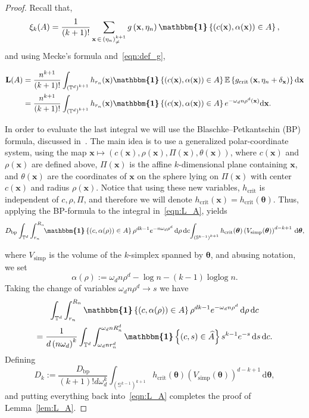 \documentclass[10pt]{amsart}
\theoremstyle{definition}\newtheorem{defi}[theo]{Definition}\newtheorem{rema}[theo]{Remark}\newtheorem{exam}[theo]{Example}\newtheorem{exem}[theo]{Example}\newtheorem{nota}[theo]{Notation}
\DeclareMathOperator{\logg}{\log\log}
\DeclareMathOperator{\simp}{simp}
\newcommand*\bL{\mathbf{L}}
\newcommand{\bx}{\mathbf{x}}
\newcommand*\T{\mathbb{T}}
\newcommand{\E}{\mathbb{E}}
\renewcommand*\S{\mathbb{S}}
\newcommand*\md{\mathrm{d}}
\newcommand{\mean}[1] {\E\left\{{#1}\right\}}
\newcommand{\ind}{\boldsymbol{\mathbbm{1}}}
\newcommand{\set}[1]{\left\{#1\right\}}
\newcommand*\bth{\boldsymbol\theta}
\newcommand*\gcrit{g_{\mathrm{crit}}}
\newcommand*\hcrit{h_{\mathrm{crit}}}
\newcommand*\Abp{{D}_{\mathrm{bp}}}
\newcommand*\vsimp{V_{\simp}}
\let\oldhat\hat
\renewcommand*{\hat}[1]{\mathchoice{\widehat{#1}}{\widehat{#1}}{\oldhat{#1}}{\oldhat{#1}}}
\begin{document}
\begin{proof}
Recall that,
\[
\xi_k(A) = \frac{1}{(k+1)!} \sum_{\bx\,\in\,\left(\eta_n\right)^{k+1}_{\ne}} g\left(\bx,\eta_n\right) \ind\set{\left(c(\bx),\alpha(\bx)\right)\in A},
\]
and using Mecke's formula and~\eqref{eqn:def_g},

\begin{equation}\label{eqn:L_A}
\begin{split}
\bL(A) &= \frac{n^{k+1}}{(k+1)!} \int_{\left(\T^d\right)^{k+1}}h_{r_n}(\bx)\ind\set{\left(c(\bx),\alpha(\bx)\right)\in A}\mean{\gcrit\left(\bx,\eta_n+\delta_{\bx}\right)} \md \bx\\
&= \frac{n^{k+1}}{(k+1)!} \int_{\left(\T^d\right)^{k+1}}h_{r_n}(\bx)\ind\set{\left(c(\bx),\alpha(\bx)\right)\in A}e^{-\omega_dn\rho^d(\bx)} \md \bx.
\end{split}
\end{equation}

In order to evaluate the last integral we will use the Blaschke--Petkantschin (BP) formula, discussed in~\cite[Appendix~C]{Bobrowski2019}. The main idea is to use a generalized polar-coordinate system, using the map $\bx \mapsto (c(\bx), \rho(\bx),\Pi(\bx),\theta(\bx))$, where $c(\bx)$ and $\rho(\bx)$ are defined above, $\Pi(\bx)$ is the affine $k$-dimensional plane containing $\bx$, and $\theta(\bx)$ are the coordinates of $\bx$ on the sphere lying on $\Pi(\bx)$ with center $c(\bx)$ and radius $\rho(\bx)$. Notice that using these new variables, $\hcrit$ is independent of $c,\rho,\Pi$, and therefore we will denote $\hcrit(\bx) = \hcrit(\bth)$. Thus, applying the BP-formula to the integral in~\eqref{eqn:L_A}, yields
\[
\Abp\int_{\T^d}\int_{r_n}^{R_n}\!\!\ind\set{\left(c, \alpha(\rho)\right)\in A}\rho^{dk-1} e^{-n\omega_d\rho^d} \, \md\rho \, \md c\!\int_{\left(\S^{k-1}\right)^{k+1}} \hcrit(\bth)\left(\vsimp(\bth)\right)^{d-k+1} \, \md\bth,
\]

where $\vsimp$ is the volume of the $k$-simplex spanned by $\bth$, and abusing notation, we set
\[
\alpha(\rho) := \omega_d n\rho^d - \log n - (k-1)\logg n.
\]
Taking the change of variables $\omega_d n\rho^d \to s$ we have
\begin{multline*}
\int_{\T^d}\int_{r_n}^{R_n} \ind\set{\left(c, \alpha(\rho)\right)\in A} \rho^{dk-1} e^{-\omega_dn\rho^d} \, \md\rho \, \md c\\
= \frac{1}{d \left(n\omega_d\right)^k}\int_{\T^d}\int_{\omega_d nr_n^d}^{\omega_d nR_n^d} \ind\set{(c, s)\in \hat A}s^{k-1} e^{-s} \, \md s \, \md c.
\end{multline*}
Defining
\[
D_k := \frac{\Abp}{(k+1)!d \omega_d^k}\int_{\left(\S^{k-1}\right)^{k+1}}\hcrit(\bth) \left(\vsimp(\bth)\right)^{d-k+1} \, \md\bth,
\]
and putting everything back into~\eqref{eqn:L_A} completes the proof of Lemma~\ref{lem:L_A}.
\end{proof}
\end{document}
